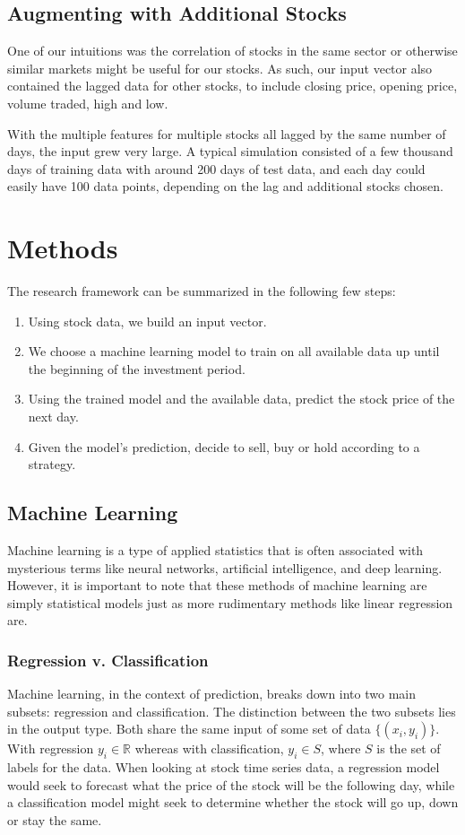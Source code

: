 \documentclass[12pt]{article}
\begin{document}
\subsection{Augmenting with Additional Stocks}
One of our intuitions was the correlation of stocks in the same sector or otherwise similar markets might be useful for our stocks. As such, our input vector also contained the lagged data for other stocks, to include closing price, opening price, volume traded, high and low.

With the multiple features for multiple stocks all lagged by the same number of days, the input grew very large. A typical simulation consisted of a few thousand days of training data with around 200 days of test data, and each day could easily have 100 data points, depending on the lag and additional stocks chosen. 

\section{Methods}
The research framework can be summarized in the following few steps:
\begin{enumerate}
	\item Using stock data, we build an input vector.
	\item We choose a machine learning model to train on all available data up until the beginning of the investment period.
	\item Using the trained model and the available data, predict the stock price of the next day.
	\item Given the model's prediction, decide to sell, buy or hold according to a strategy.
\end{enumerate}

\subsection{Machine Learning} 
Machine learning is a type of applied statistics that is often associated with mysterious terms like neural networks, artificial intelligence, and deep learning. However, it is important to note that these methods of machine learning are simply statistical models just as more rudimentary methods like linear regression are.

\subsubsection{Regression v. Classification}
Machine learning, in the context of prediction, breaks down into two main subsets: regression and classification. The distinction between the two subsets lies in the output type. Both share the same input of some set of data $\{(x_i, y_i)\}$. With regression $y_i \in \mathbb{R}$ whereas with classification, $y_i \in S$, where $S$ is the set of labels for the data.  \cite[9-10]{springer} When looking at stock time series data, a regression model would seek to forecast what the price of the stock will be the following day, while a classification model might seek to determine whether the stock will go up, down or stay the same. 
\end{document}
